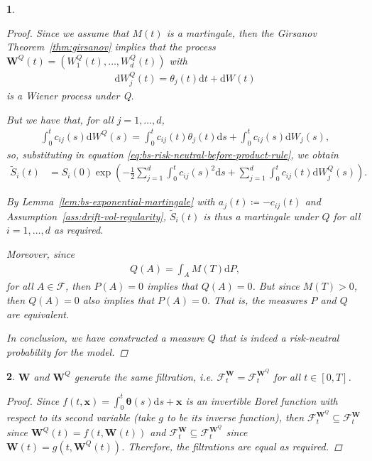 \documentclass[english]{article}
\numberwithin{equation}{section}
\numberwithin{figure}{section}
\theoremstyle{bolddescit}
\newtheorem{theorem}{\protect\theoremname}[section]
\theoremstyle{definition}
\theoremstyle{definition}
\theoremstyle{plain}
\theoremstyle{plain}
\theoremstyle{bolddesc}
\theoremstyle{plain}
\theoremstyle{remark}
\providecommand{\theoremname}{Theorem}
\begin{document}
\begin{theorem}
\begin{proof}
    Since we assume that $M(t)$ is a martingale, then the Girsanov Theorem~\ref{thm:girsanov} implies that the process $\mathbf{W}^Q(t) = (W^Q_1(t), \ldots, W^Q_d(t))$ with
    \begin{align*}
      \mathrm{d}W^Q_j(t) = \theta_j(t) \mathrm{d}t + \mathrm{d}W(t)
    \end{align*}
    is a Wiener process under Q.

    But we have that, for all $j=1,\ldots,d$,
    \begin{align*}
      \int_0^t c_{ij}(s) \mathrm{d}W^Q(s)
      = \int_0^t c_{ij}(t) \theta_j(t) \mathrm{d}s + \int_0^t c_{ij}(s) \mathrm{d}W_j(s),
    \end{align*}
    so, substituting in equation \eqref{eq:bs-risk-neutral-before-product-rule}, we obtain
    \begin{align}\label{eq:bs-discounted-stock-price}
      \widetilde{S}_i(t)
      &= S_i(0) \exp \left( - \frac{1}{2} \sum_{j=1}^{d} \int_0^t c_{ij}(s)^2 \mathrm{d}s
      + \sum_{j=1}^d \int_0^t c_{ij}(t) \mathrm{d}W^Q_j(s)\right).
    \end{align}

    By Lemma~\ref{lem:bs-exponential-martingale} with $a_j(t) \coloneqq - c_{ij}(t)$ and Assumption~\ref{ass:drift-vol-regularity}, $\widetilde{S}_i(t)$ is thus a martingale under $Q$ for all $i=1,\ldots,d$ as required.

    Moreover, since
    \begin{align*}
      Q(A) = \int_A M(T) \mathrm{d}P,
    \end{align*}
    for all $A \in \mathcal{F}$, then $P(A) = 0$ implies that $Q(A) = 0$. But since $M(T) > 0$, then $Q(A) = 0$ also implies that $P(A) = 0$. That is, the measures $P$ and $Q$ are equivalent.

    In conclusion, we have constructed a measure $Q$ that is indeed a risk-neutral probability for the model.
  \end{proof}
\end{theorem}

\begin{theorem}
  $\mathbf{W}$ and $\mathbf{W}^Q$ generate the same filtration, i.e. $\mathcal{F}^\mathbf{W}_t = \mathcal{F}^{\mathbf{W}^Q}_t$ for all $t \in [0,T]$.

  \begin{proof}
    Since $f(t, \mathbf{x}) = \int_0^t \mathbf{\theta}(s) \mathrm{d}s + \mathbf{x}$ is an invertible Borel function with respect to its second variable (take $g$ to be its inverse function), then $\mathcal{F}^{\mathbf{W}^Q}_t \subseteq \mathcal{F}^{\mathbf{W}}_t$ since $\mathbf{W}^Q(t) = f(t,\mathbf{W}(t))$ and $\mathcal{F}^{\mathbf{W}}_t \subseteq \mathcal{F}^{\mathbf{W}^Q}_t$ since $\mathbf{W}(t) = g(t,\mathbf{W}^Q(t))$. Therefore, the filtrations are equal as required.
  \end{proof}
\end{theorem}
\end{document}
